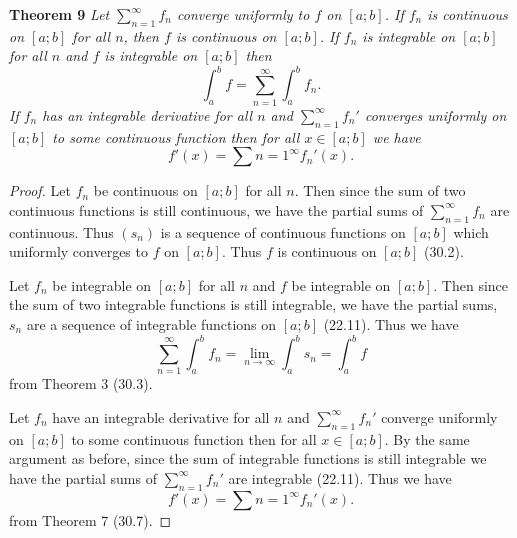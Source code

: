 \documentclass{article}
\begin{document}
\begin{flushleft}
\textbf{Theorem 9}
\textsl{Let $\sum_{n=1}^{\infty} f_n$ converge uniformly to $f$ on $[a;b]$. If $f_n$ is continuous on $[a;b]$ for all $n$, then $f$ is continuous on $[a;b]$. If $f_n$ is integrable on $[a;b]$ for all $n$ and $f$ is integrable on $[a;b]$ then
\[
\int_a^b f = \sum_{n=1}^{\infty} \int_a^b f_n.
\]
If $f_n$ has an integrable derivative for all $n$ and $\sum_{n=1}^{\infty} f_n'$ converges uniformly on $[a;b]$ to some continuous function then for all $x \in [a;b]$ we have
\[
f'(x) = \sum{n=1}^{\infty} f_n' (x).
\]}
\begin{proof}
Let $f_n$ be continuous on $[a;b]$ for all $n$. Then since the sum of two continuous functions is still continuous, we have the partial sums of $\sum_{n=1}^{\infty} f_n$ are continuous. Thus $(s_n)$ is a sequence of continuous functions on $[a;b]$ which uniformly converges to $f$ on $[a;b]$. Thus $f$ is continuous on $[a;b]$ (30.2).\newline

Let $f_n$ be integrable on $[a;b]$ for all $n$ and $f$ be integrable on $[a;b]$. Then since the sum of two integrable functions is still integrable, we have the partial sums, $s_n$ are a sequence of integrable functions on $[a;b]$ (22.11). Thus we have
\[
\sum_{n=1}^{\infty} \int_a^b f_n = \lim_{n \rightarrow \infty} \int_a^b s_n = \int_a^b f
\]
from Theorem 3 (30.3).\newline

Let $f_n$ have an integrable derivative for all $n$ and $\sum_{n=1}^{\infty} f_n'$ converge uniformly on $[a;b]$ to some continuous function then for all $x \in [a;b]$. By the same argument as before, since the sum of integrable functions is still integrable we have the partial sums of $\sum_{n=1}^{\infty} f_n'$ are integrable (22.11). Thus we have
\[
f'(x) = \sum{n=1}^{\infty} f_n' (x).
\]
from Theorem 7 (30.7).
\end{proof}


\end{flushleft}
\end{document}
